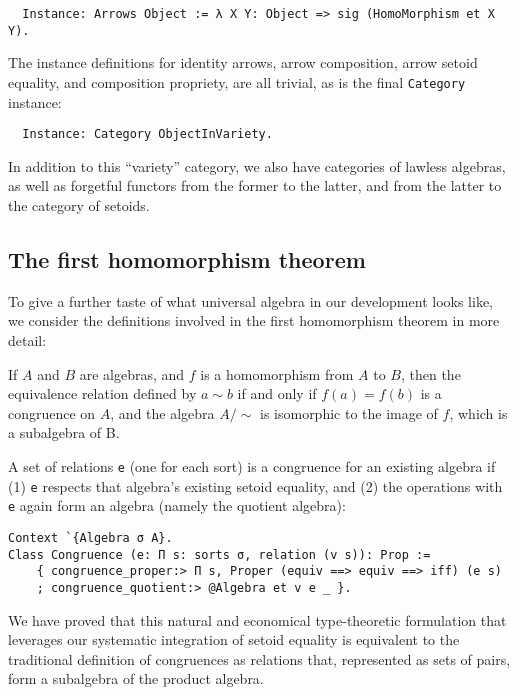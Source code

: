 \documentclass[a4paper,10pt,runningheads]{llncs}
\begin{document}
\begin{lstlisting}
  Instance: Arrows Object := λ X Y: Object => sig (HomoMorphism et X Y).
\end{lstlisting}

The instance definitions for identity arrows, arrow composition, arrow setoid equality, and composition propriety, are all trivial, as is the final \lstinline|Category| instance:
\begin{lstlisting}
  Instance: Category ObjectInVariety.
\end{lstlisting}

In addition to this ``variety'' category, we also have categories of lawless algebras, as well as forgetful functors from the former to the latter, and from the latter to the category of setoids.

\subsection{The first homomorphism theorem}

To give a further taste of what universal algebra in our development looks like, we consider the definitions involved in the first homomorphism theorem in more detail:
\begin{theorem}
If $A$ and $B$ are algebras, and $f$ is a homomorphism from $A$ to $B$, then the equivalence relation defined by $a\sim b$ if and only if $f(a)=f(b)$ is a congruence on $A$, and the algebra $A/\sim$ is isomorphic to the image of $f$, which is a subalgebra of B.
\end{theorem}

A set of relations \lstinline|e| (one for each sort) is a congruence for an existing algebra if (1) \lstinline|e| respects that algebra's existing setoid equality, and (2) the operations with \lstinline|e| again form an algebra (namely the quotient algebra):
\begin{lstlisting}
Context `{Algebra σ A}.
Class Congruence (e: Π s: sorts σ, relation (v s)): Prop :=
    { congruence_proper:> Π s, Proper (equiv ==> equiv ==> iff) (e s)
    ; congruence_quotient:> @Algebra et v e _ }.
\end{lstlisting}
We have proved that this natural and economical type-theoretic formulation that leverages our systematic integration of setoid equality is equivalent to the traditional definition of congruences as relations that, represented as sets of pairs, form a subalgebra of the product algebra.
\end{document}
